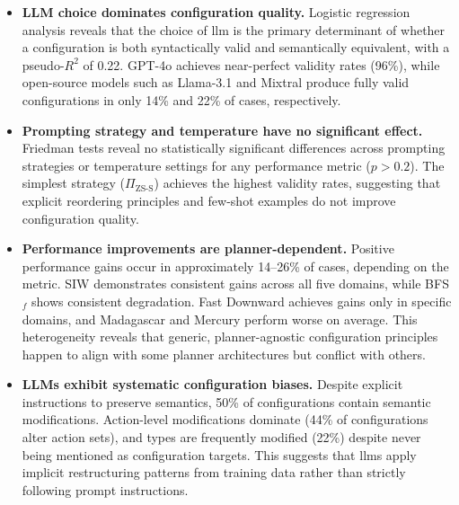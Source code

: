 \begin{itemize}
  \item \textbf{LLM choice dominates configuration quality.}
        Logistic regression analysis reveals that the choice of \gls{llm} is the primary determinant of whether a configuration is both syntactically valid and semantically equivalent, with a pseudo-$R^2$ of 0.22.
        GPT-4o achieves near-perfect validity rates (96\%), while open-source models such as Llama-3.1 and Mixtral produce fully valid configurations in only 14\% and 22\% of cases, respectively.

  \item \textbf{Prompting strategy and temperature have no significant effect.}
        Friedman tests reveal no statistically significant differences across prompting strategies or temperature settings for any performance metric ($p > 0.2$).
        The simplest strategy ($\Pi_{\text{ZS-S}}$) achieves the highest validity rates, suggesting that explicit reordering principles and few-shot examples do not improve configuration quality.

  \item \textbf{Performance improvements are planner-dependent.}
        Positive performance gains occur in approximately 14--26\% of cases, depending on the metric.
        SIW demonstrates consistent gains across all five domains, while BFS$_f$ shows consistent degradation.
        Fast Downward achieves gains only in specific domains, and Madagascar and Mercury perform worse on average.
        This heterogeneity reveals that generic, planner-agnostic configuration principles happen to align with some planner architectures but conflict with others.

  \item \textbf{LLMs exhibit systematic configuration biases.}
        Despite explicit instructions to preserve semantics, 50\% of configurations contain semantic modifications.
        Action-level modifications dominate (44\% of configurations alter action sets), and types are frequently modified (22\%) despite never being mentioned as configuration targets.
        This suggests that \glspl{llm} apply implicit restructuring patterns from training data rather than strictly following prompt instructions.
\end{itemize}


